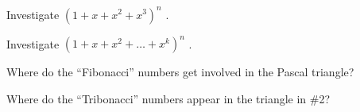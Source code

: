\documentclass[10pt,]{book}
\theoremstyle{plain}
\theoremstyle{definition}
\theoremstyle{definition}
\theoremstyle{definition}
\theoremstyle{definition}
\numberwithin{equation}{chapter}
\begin{document}
\begin{divisionexercise}{5}\hypertarget{exercise-152}{}
\hypertarget{p-1321}{}%
Investigate \(\left( 1 + x + x^{2} + x^{3} \right)^{n}\) .%
\end{divisionexercise}%
\begin{divisionexercise}{6}\hypertarget{exercise-153}{}
\hypertarget{p-1322}{}%
Investigate \(\left( 1 + x + x^{2} + \ldots + x^{k} \right)^{n}\) .%
\end{divisionexercise}%
\begin{divisionexercise}{7}\hypertarget{exercise-154}{}
\hypertarget{p-1323}{}%
Where do the ``Fibonacci'' numbers get involved in the Pascal triangle?%
\end{divisionexercise}%
\begin{divisionexercise}{8}\hypertarget{exercise-155}{}
\hypertarget{p-1324}{}%
Where do the ``Tribonacci'' numbers appear in the triangle in \#2?%
\end{divisionexercise}%
\typeout{************************************************}
\typeout{************************************************}
\end{document}
